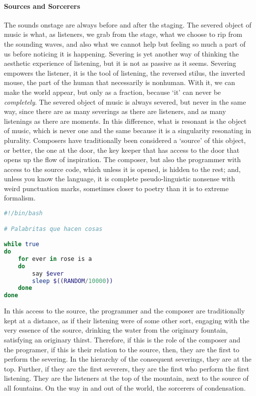 \paragraph{Sources and Sorcerers}
The sounds onstage are always before and after the staging. The severed object of music is what, as listeners, we grab from the stage, what we choose to rip from the sounding waves, and also what we cannot help but feeling so much a part of us before noticing it is happening. Severing is yet another way of thinking the aesthetic experience of listening, but it is not as passive as it seems. Severing empowers the listener, it is the tool of listening, the reversed stilus, the inverted mouse, the part of the human that necessarily is nonhuman. With it, we can make the world appear, but only as a fraction, because `it' can never be \textit{completely}. The severed object of music is always severed, but never in the same way, since there are as many severings as there are listeners, and as many listenings as there are moments. In this difference, what is resonant is the object of music, which is never one and the same because it is a singularity resonating in plurality. Composers have traditionally been considered a `source' of this object, or better, the one at the door, the key keeper that has access to the door that opens up the flow of inspiration. The composer, but also the programmer with access to the source code, which unless it is opened, is hidden to the rest; and, unless you know the language, it is complete pseudo-linguistic nonsense with weird punctuation marks, sometimes closer to poetry than it is to extreme formalism. 

\begin{flushleft}
\small
\begin{lstlisting}[caption={Little words that do things},captionpos=b,language=bash,mathescape=false]
#!/bin/bash

# Palabritas que hacen cosas

while true
do
	for ever in rose is a
	do 
		say $ever
		sleep $((RANDOM/10000))
	done
done

\end{lstlisting}
\end{flushleft}

In this access to the source, the programmer and the composer are traditionally kept at a distance, as if their listening were of some other sort, engaging with the very essence of the source, drinking the water from the originary fountain, satisfying an originary thirst. Therefore, if this is the role of the composer and the programer, if this is their relation to the source, then, they are the first to perform the severing. In the hierarchy of the consequent severings, they are at the top. Further, if they are the first severers, they are the first who perform the first listening. They are the listeners at the top of the mountain, next to the source of all fountains. On the way in and out of the world, the sorcerers of condensation.

